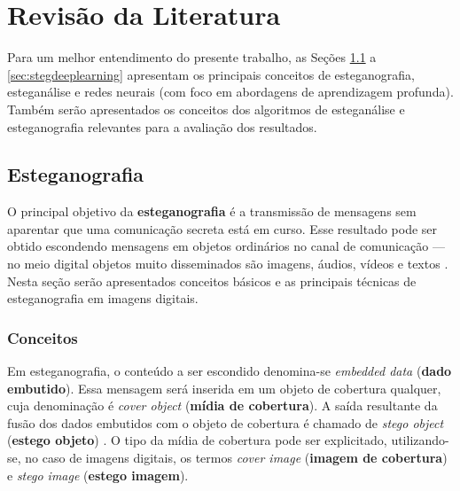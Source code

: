 
\chapter{Revisão da Literatura}
\label{chap:revisao_da_literatura}

Para um melhor entendimento do presente trabalho, as Seções \ref{sec:esteganografia} a \ref{sec:stegdeeplearning} apresentam os principais conceitos de esteganografia, esteganálise e redes neurais (com foco em abordagens de aprendizagem profunda). Também serão apresentados os conceitos dos algoritmos de esteganálise e esteganografia relevantes para a avaliação dos resultados.


\section{Esteganografia}
\label{sec:esteganografia}

O principal objetivo da \textbf{esteganografia} é a transmissão de mensagens sem aparentar que uma comunicação secreta está em curso. Esse resultado pode ser obtido escondendo mensagens em objetos ordinários no canal de comunicação --- no meio digital objetos muito disseminados são imagens, áudios, vídeos e textos \cite{fridrich2009steganography}. Nesta seção serão apresentados conceitos básicos e as principais técnicas de esteganografia em imagens digitais.

\subsection{Conceitos}
Em esteganografia, o conteúdo a ser escondido denomina-se \textit{embedded data} (\textbf{dado embutido}).
Essa mensagem será inserida em um objeto de cobertura qualquer, cuja denominação é \textit{cover object} (\textbf{mídia de cobertura}). A saída resultante da fusão dos dados embutidos com o objeto de cobertura é chamado de \textit{stego object} (\textbf{estego objeto}) \cite{petitcolas1999information}. O tipo da mídia de cobertura pode ser explicitado, utilizando-se, no caso de imagens digitais, os termos \textit{cover image} (\textbf{imagem de cobertura}) e \textit{stego image} (\textbf{estego imagem}).

